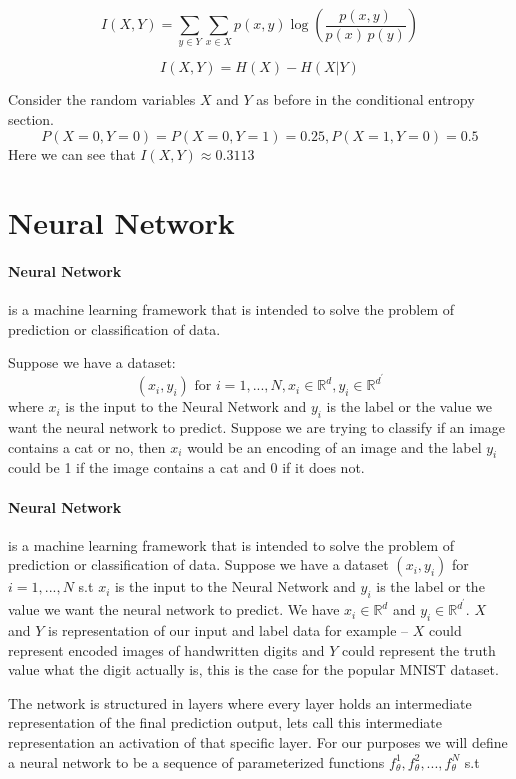 \begin{equation}
      I(X,Y)=\sum _{y\in Y}\sum _{x\in X}{p(x,y)\log {\left({\frac
      {p(x,y)}{p(x)\,p(y)}}\right)}} 
\label{eq:miExplicit}
\end{equation}

\begin{equation}
  I(X, Y) = H(X) - H(X|Y)
\label{eq:miEntropy}
\end{equation}

Consider the random variables $X$ and $Y$ as before in the conditional entropy
section. 
$$P(X=0,Y=0) = P(X=0,Y=1) = 0.25, P(X=1,Y=0) = 0.5$$
Here we can see that $I(X,Y) \approx 0.3113$

\section{Neural Network}

\paragraph{Neural Network} is a machine learning framework that is intended to
solve the problem of prediction or classification of data. 

Suppose we have a dataset:
$$ (x_i, y_i) \text{ for } i = 1,...,N, x_i \in \mathbb{R}^d, y_i \in \mathbb{R}^{d^\prime}$$ 
where $x_i$ is the input to the Neural Network and $y_i$ is the label or the
value we want the neural network to predict. Suppose we are trying to classify
if an image contains a cat or no, then $x_i$ would be an encoding of an image
and the label $y_i$ could be 1 if the image contains a cat and 0 if it does not.

\paragraph{Neural Network} is a machine learning framework that is intended to
solve the problem of prediction or classification of data. Suppose we have a
dataset $(x_i, y_i)$ for $i = 1,...,N$ s.t $x_i$ is the input to the Neural
Network and $y_i$ is the label or the value we want the neural network to
predict. We have $x_i \in \mathbb{R}^d$ and $y_i \in \mathbb{R}^{d^\prime}$. $X$
and $Y$ is representation of our input and label data for example -- $X$ could
represent encoded images of handwritten digits and $Y$ could represent the truth
value what the digit actually is, this is the case for the popular MNIST
dataset.

The network is structured in layers where every layer holds an intermediate
representation of the final prediction output, lets call this intermediate
representation an activation of that specific layer. For our purposes we will
define a neural network to be a sequence of parameterized functions
$f_{\theta}^1, f_{\theta}^2, ...  ,f_{\theta}^N$ s.t

